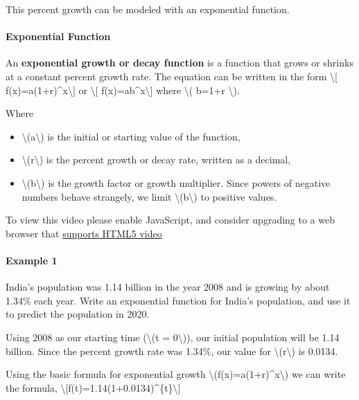 This percent growth can be modeled with an exponential function.

\hypertarget{exponential-function}{%
\paragraph{Exponential Function}\label{exponential-function}}

An \textbf{exponential growth or decay function} is a function that
grows or shrinks at a constant percent growth rate. The equation can be
written in the form \textbackslash{}{[}
f(x)=a(1+r)\^{}x\textbackslash{}{]} or \textbackslash{}{[}
f(x)=ab\^{}x\textbackslash{}{]} where \textbackslash{}( b=1+r
\textbackslash{}).

Where

\begin{itemize}
\tightlist
\item
  \textbackslash{}(a\textbackslash{}) is the initial or starting value
  of the function,
\item
  \textbackslash{}(r\textbackslash{}) is the percent growth or decay
  rate, written as a decimal,
\item
  \textbackslash{}(b\textbackslash{}) is the growth factor or growth
  multiplier. Since powers of negative numbers behave strangely, we
  limit \textbackslash{}(b\textbackslash{}) to positive values.
\end{itemize}

To view this video please enable JavaScript, and consider upgrading to a
web browser that \href{http://videojs.com/html5-video-support/}{supports
HTML5 video}

\hypertarget{example-1}{%
\paragraph{Example 1}\label{example-1}}

India's population was 1.14 billion in the year 2008 and is growing by
about 1.34\% each year. Write an exponential function for India's
population, and use it to predict the population in 2020.

Using 2008 as our starting time (\textbackslash{}(t =
0\textbackslash{})), our initial population will be 1.14 billion. Since
the percent growth rate was 1.34\%, our value for
\textbackslash{}(r\textbackslash{}) is 0.0134.

Using the basic formula for exponential growth
\textbackslash{}(f(x)=a(1+r)\^{}x\textbackslash{}) we can write the
formula,
\textbackslash{}{[}f(t)=1.14(1+0.0134)\^{}\{t\}\textbackslash{}{]}

